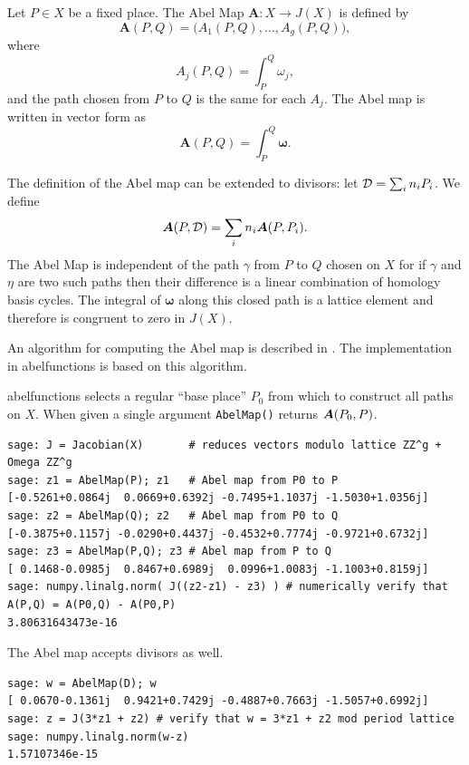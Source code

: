 \begin{definition}\label{def:abelmap}
  Let $P \in X$ be a fixed place. The Abel Map $\boldsymbol{A} : X \to
  J(X)$ is defined by
  \begin{equation} \label{eqn:abel1}
    \boldsymbol{A}(P,Q) = \big( A_1(P,Q), \ldots, A_g(P,Q) \big),
  \end{equation}
  where
  \begin{equation} \label{eqn:abel2}
    A_j(P,Q) = \int_P^Q \omega_j,
  \end{equation}
  and the path chosen from $P$ to $Q$ is the same for each $A_j$. The
  Abel map is written in vector form as
  \begin{equation} \label{eqn:abel-vector}
    \boldsymbol{A}(P,Q) = \int_P^Q \boldsymbol{\omega}.
  \end{equation}
\end{definition}
The definition of the Abel map can be extended to divisors: let $\operatorname{\mathcal{D}} =
\sum_i n_i P_i$. We define
\begin{equation} \label{eqn:abel-divisors}
  \boldsymbol{A}(P,\operatorname{\mathcal{D}}) = \sum_i n_i \boldsymbol{A}(P,P_i).
\end{equation}
The Abel Map is independent of the path $\gamma$ from $P$ to $Q$ chosen
on $X$ for if $\gamma$ and $\eta$ are two such paths then their
difference is a linear combination of homology basis cycles. The
integral of $\boldsymbol{\omega}$ along this closed path is a lattice
element and therefore is congruent to zero in $J(X)$.

An algorithm for computing the Abel map is described in
\cite{DeconinckPatterson11}. The implementation in {\sc abelfunctions}
is based on this algorithm.

\begin{example}
{\sc abelfunctions} selects a regular ``base place'' $P_0$ from which to
construct all paths on $X$. When given a single argument {\tt AbelMap()}
returns $\operatorname{\boldsymbol{A}}(P_0,P)$.
\begin{lstlisting}
sage: J = Jacobian(X)       # reduces vectors modulo lattice ZZ^g + Omega ZZ^g
sage: z1 = AbelMap(P); z1   # Abel map from P0 to P
[-0.5261+0.0864j  0.0669+0.6392j -0.7495+1.1037j -1.5030+1.0356j]
sage: z2 = AbelMap(Q); z2   # Abel map from P0 to Q
[-0.3875+0.1157j -0.0290+0.4437j -0.4532+0.7774j -0.9721+0.6732j]
sage: z3 = AbelMap(P,Q); z3 # Abel map from P to Q
[ 0.1468-0.0985j  0.8467+0.6989j  0.0996+1.0083j -1.1003+0.8159j]
sage: numpy.linalg.norm( J((z2-z1) - z3) ) # numerically verify that A(P,Q) = A(P0,Q) - A(P0,P)
3.80631643473e-16
\end{lstlisting}
The Abel map accepts divisors as well.
\begin{lstlisting}
sage: w = AbelMap(D); w
[ 0.0670-0.1361j  0.9421+0.7429j -0.4887+0.7663j -1.5057+0.6992j]
sage: z = J(3*z1 + z2) # verify that w = 3*z1 + z2 mod period lattice
sage: numpy.linalg.norm(w-z)
1.57107346e-15
\end{lstlisting}
\end{example}


